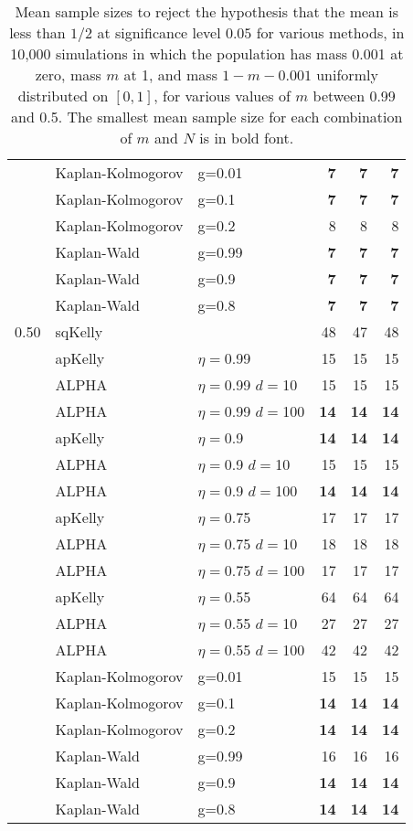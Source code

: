 \documentclass[12pt,runningheads]{llncs}
\begin{document}
{\begin{table}
\begin{tabular}{lll|rrr}
\cline{2-6}
 & Kaplan-Kolmogorov & g=0.01 & \bf{7}  & \bf{7}  & \bf{7}  \\
 & Kaplan-Kolmogorov & g=0.1 & \bf{7}  & \bf{7}  & \bf{7}  \\
 & Kaplan-Kolmogorov & g=0.2 & 8  & 8  & 8  \\
\cline{2-6}
 & Kaplan-Wald & g=0.99 & \bf{7}  & \bf{7}  & \bf{7}  \\
 & Kaplan-Wald & g=0.9 & \bf{7}  & \bf{7}  & \bf{7}  \\
 & Kaplan-Wald & g=0.8 & \bf{7}  & \bf{7}  & \bf{7}  \\
\hline 0.50 & sqKelly & & 48  & 47  & 48  \\
\cline{2-6} & apKelly & $\eta=$0.99 & 15  & 15  & 15  \\
\cline{2-6}
& ALPHA & $\eta=$0.99 $d=$10 & 15  & 15  & 15  \\
& ALPHA & $\eta=$0.99 $d=$100 & \bf{14}  & \bf{14}  & \bf{14}  \\
\cline{2-6} & apKelly & $\eta=$0.9 & \bf{14}  & \bf{14}  & \bf{14}  \\
\cline{2-6}
& ALPHA & $\eta=$0.9 $d=$10 & 15  & 15  & 15  \\
& ALPHA & $\eta=$0.9 $d=$100 & \bf{14}  & \bf{14}  & \bf{14}  \\
\cline{2-6} & apKelly & $\eta=$0.75 & 17  & 17  & 17  \\
\cline{2-6}
& ALPHA & $\eta=$0.75 $d=$10 & 18  & 18  & 18  \\
& ALPHA & $\eta=$0.75 $d=$100 & 17  & 17  & 17  \\
\cline{2-6} & apKelly & $\eta=$0.55 & 64  & 64  & 64  \\
\cline{2-6}
& ALPHA & $\eta=$0.55 $d=$10 & 27  & 27  & 27  \\
& ALPHA & $\eta=$0.55 $d=$100 & 42  & 42  & 42  \\
\cline{2-6}
 & Kaplan-Kolmogorov & g=0.01 & 15  & 15  & 15  \\
 & Kaplan-Kolmogorov & g=0.1 & \bf{14}  & \bf{14}  & \bf{14}  \\
 & Kaplan-Kolmogorov & g=0.2 & \bf{14}  & \bf{14}  & \bf{14}  \\
\cline{2-6}
 & Kaplan-Wald & g=0.99 & 16  & 16  & 16  \\
 & Kaplan-Wald & g=0.9 & \bf{14}  & \bf{14}  & \bf{14}  \\
 & Kaplan-Wald & g=0.8 & \bf{14}  & \bf{14}  & \bf{14}  \\
 \end{tabular} 
\caption{\protect \label{tab:comparison-1} Mean sample sizes to reject the hypothesis that
the mean is less than $1/2$ at significance level $0.05$ for various methods, in 10,000 simulations in which the
population has mass 0.001 at zero, 
mass $m$ at 1, and mass $1-m-0.001$ uniformly distributed on $[0, 1]$, for various values of $m$ between 0.99 and 0.5.
The smallest mean sample size for each combination of $m$ and $N$ is in bold font.
}
\end{table}
 
}
\end{document}
